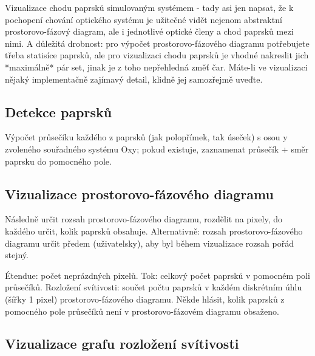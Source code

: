 
Vizualizace chodu paprsků simulovaným systémem - tady asi jen napsat, že
k pochopení chování optického systému je užitečné vidět nejenom
abstraktní prostorovo-fázový diagram, ale i jednotlivé optické členy a
chod paprsků mezi nimi. A důležitá drobnost: pro výpočet
prostorovo-fázového diagramu potřebujete třeba statisíce paprsků, ale
pro vizualizaci chodu paprsků je vhodné nakreslit jich *maximálně* pár
set, jinak je z toho nepřehledná změť čar. Máte-li ve vizualizaci nějaký
implementačně zajímavý detail, klidně jej samozřejmě uveďte.

\subsection{Detekce paprsků}


Výpočet průsečíku každého z
paprsků (jak polopřímek, tak úseček) s osou y zvoleného souřadného
systému Oxy; pokud existuje, zaznamenat průsečík + směr paprsku do
pomocného pole.


\subsection{Vizualizace prostorovo-fázového diagramu}


Následně určit rozsah prostorovo-fázového diagramu,
rozdělit na pixely, do každého určit, kolik paprsků obsahuje.
Alternativně: rozsah prostorovo-fázového diagramu určit předem
(uživatelsky), aby byl během vizualizace rozsah pořád stejný.

Étendue: počet neprázdných pixelů. Tok: celkový počet paprsků v pomocném
poli průsečíků. Rozložení svítivosti: součet počtu paprsků v každém
diskrétním úhlu (šířky 1 pixel) prostorovo-fázového diagramu. Někde
hlásit, kolik paprsků z pomocného pole průsečíků není v
prostorovo-fázovém diagramu obsaženo.

\subsection{Vizualizace grafu rozložení svítivosti}

\todo{}
